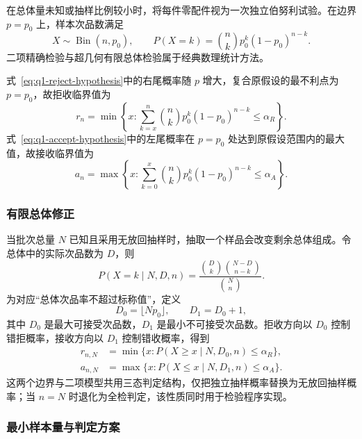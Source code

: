 在总体量未知或抽样比例较小时，将每件零配件视为一次独立伯努利试验。在边界 $p=p_0$ 上，样本次品数满足
\begin{equation}
  X\sim\operatorname{Bin}(n,p_0),\qquad
  P(X=k)=\binom{n}{k}p_0^k(1-p_0)^{n-k}.
  \label{eq:q1-binomial-pmf}
\end{equation}
二项精确检验与超几何有限总体检验属于经典数理统计方法\cite{stat-casella}。

式~\eqref{eq:q1-reject-hypothesis}中的右尾概率随 $p$ 增大，复合原假设的最不利点为 $p=p_0$，故拒收临界值为
\begin{equation}
  r_n=\min\left\{x:
  \sum_{k=x}^{n}\binom{n}{k}p_0^k(1-p_0)^{n-k}
  \le \alpha_R\right\}.
  \label{eq:q1-binomial-reject-cutoff}
\end{equation}
式~\eqref{eq:q1-accept-hypothesis}中的左尾概率在 $p=p_0$ 处达到原假设范围内的最大值，故接收临界值为
\begin{equation}
  a_n=\max\left\{x:
  \sum_{k=0}^{x}\binom{n}{k}p_0^k(1-p_0)^{n-k}
  \le \alpha_A\right\}.
  \label{eq:q1-binomial-accept-cutoff}
\end{equation}

\subsubsection{有限总体修正}

当批次总量 $N$ 已知且采用无放回抽样时，抽取一个样品会改变剩余总体组成。令总体中的实际次品数为 $D$，则
\begin{equation}
  P(X=k\mid N,D,n)
  =\frac{\binom{D}{k}\binom{N-D}{n-k}}{\binom{N}{n}}.
  \label{eq:q1-hypergeometric-pmf}
\end{equation}
为对应“总体次品率不超过标称值”，定义
\begin{equation}
  D_0=\lfloor Np_0\rfloor,\qquad D_1=D_0+1,
  \label{eq:q1-finite-boundaries}
\end{equation}
其中 $D_0$ 是最大可接受次品数，$D_1$ 是最小不可接受次品数。拒收方向以 $D_0$ 控制错拒概率，接收方向以 $D_1$ 控制错收概率，得到
\begin{align}
  r_{n,N}
  &=\min\{x:P(X\ge x\mid N,D_0,n)\le\alpha_R\},
  \label{eq:q1-hyper-reject}\\
  a_{n,N}
  &=\max\{x:P(X\le x\mid N,D_1,n)\le\alpha_A\}.
  \label{eq:q1-hyper-accept}
\end{align}
这两个边界与二项模型共用三态判定结构，仅把独立抽样概率替换为无放回抽样概率；当 $n=N$ 时退化为全检判定，该性质同时用于检验程序实现。

\subsubsection{最小样本量与判定方案}

